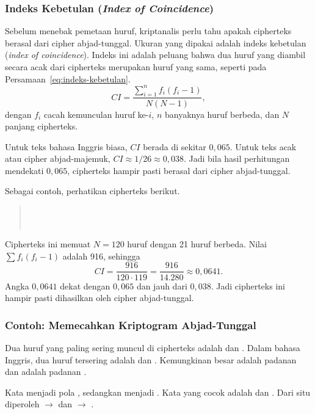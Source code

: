 \subsubsection{Indeks Kebetulan (\textit{Index of Coincidence})}
\label{sec:indeks-kebetulan}

Sebelum menebak pemetaan huruf, kriptanalis perlu tahu apakah cipherteks
berasal dari cipher abjad-tunggal. Ukuran yang dipakai adalah indeks
kebetulan (\textit{index of coincidence}). Indeks ini adalah peluang bahwa
dua huruf yang diambil secara acak dari cipherteks merupakan huruf yang sama,
seperti pada Persamaan~\ref{eq:indeks-kebetulan}.
\begin{equation}
    CI = \frac{\sum_{i=1}^{n} f_i (f_i - 1)}{N (N - 1)},
    \label{eq:indeks-kebetulan}
\end{equation}
dengan $f_i$ cacah kemunculan huruf ke-$i$, $n$ banyaknya huruf berbeda, dan
$N$ panjang cipherteks.

Untuk teks bahasa Inggris biasa, $CI$ berada di sekitar $0{,}065$. Untuk teks
acak atau cipher abjad-majemuk, $CI \approx 1/26 \approx 0{,}038$. Jadi bila
hasil perhitungan mendekati $0{,}065$, cipherteks hampir pasti berasal dari
cipher abjad-tunggal.

Sebagai contoh, perhatikan cipherteks berikut.
\begin{quote}
\raggedright
{}\\
\\
\end{quote}
Cipherteks ini memuat $N=120$ huruf dengan 21 huruf berbeda. Nilai
$\sum f_i(f_i-1)$ adalah 916, sehingga
\[
CI = \frac{916}{120 \cdot 119} = \frac{916}{14.280} \approx 0{,}0641.
\]
Angka $0{,}0641$ dekat dengan $0{,}065$ dan jauh dari $0{,}038$. Jadi
cipherteks ini hampir pasti dihasilkan oleh cipher abjad-tunggal.

\subsubsection{Contoh: Memecahkan Kriptogram Abjad-Tunggal}

Dua huruf yang paling sering muncul di cipherteks adalah  dan
. Dalam bahasa Inggris, dua huruf tersering adalah  dan
. Kemungkinan besar  adalah padanan  dan 
adalah padanan .

Kata  menjadi pola , sedangkan  menjadi
. Kata yang cocok adalah  dan . Dari situ
diperoleh  $\rightarrow$  dan  $\rightarrow$ .

